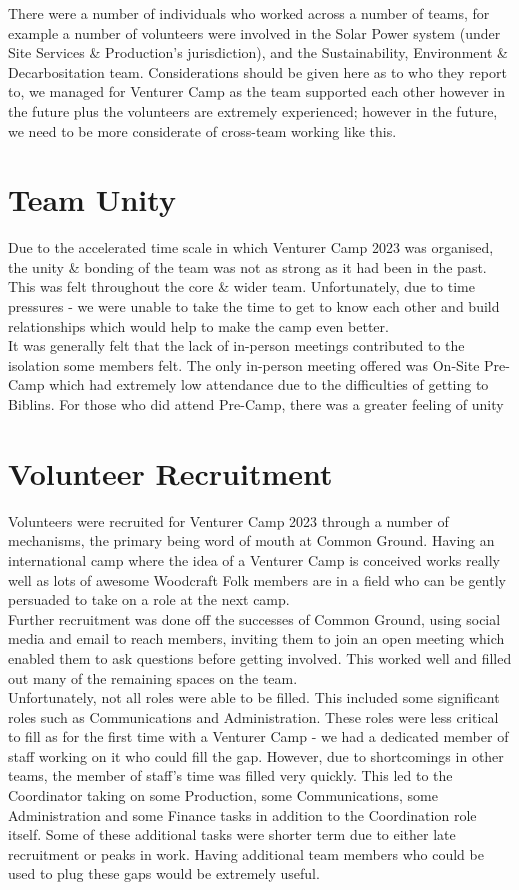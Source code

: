 There were a number of individuals who worked across a number of teams, for example a number of volunteers were involved in the Solar Power system (under Site Services \& Production's jurisdiction), and the Sustainability, Environment \& Decarbositation team. Considerations should be given here as to who they report to, we managed for Venturer Camp as the team supported each other however in the future plus the volunteers are extremely experienced; however in the future, we need to be more considerate of cross-team working like this. 

\section{Team Unity}
Due to the accelerated time scale in which Venturer Camp 2023 was organised, the unity \& bonding of the team was not as strong as it had been in the past. This was felt throughout the core \& wider team. Unfortunately, due to time pressures - we were unable to take the time to get to know each other and build relationships which would help to make the camp even better.\\

It was generally felt that the lack of in-person meetings contributed to the isolation some members felt. The only in-person meeting offered was On-Site Pre-Camp which had extremely low attendance due to the difficulties of getting to Biblins. For those who did attend Pre-Camp, there was a greater feeling of unity 

\section{Volunteer Recruitment}
Volunteers were recruited for Venturer Camp 2023 through a number of mechanisms, the primary being word of mouth at Common Ground. Having an international camp where the idea of a Venturer Camp is conceived works really well as lots of awesome Woodcraft Folk members are in a field who can be gently persuaded to take on a role at the next camp.\\ 

Further recruitment was done off the successes of Common Ground, using social media and email to reach members, inviting them to join an open meeting which enabled them to ask questions before getting involved. This worked well and filled out many of the remaining spaces on the team.\\

Unfortunately, not all roles were able to be filled. This included some significant roles such as Communications and Administration. These roles were less critical to fill as for the first time with a Venturer Camp - we had a dedicated member of staff working on it who could fill the gap. However, due to shortcomings in other teams, the member of staff's time was filled very quickly. This led to the Coordinator taking on some Production, some Communications, some Administration and some Finance tasks in addition to the Coordination role itself. Some of these additional tasks were shorter term due to either late recruitment or peaks in work. Having additional team members who could be used to plug these gaps would be extremely useful. \\


